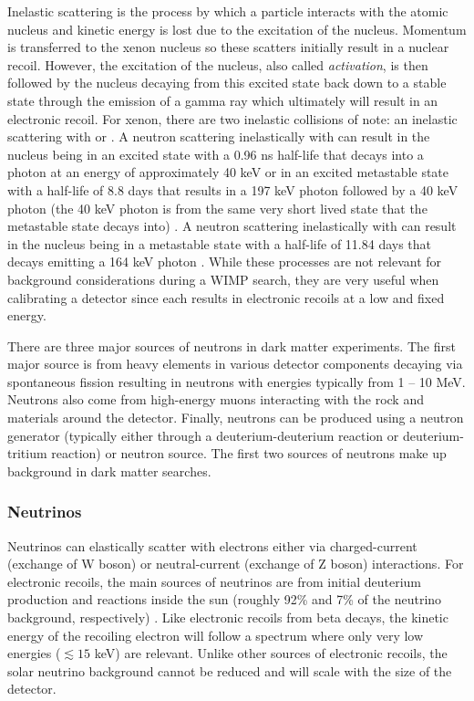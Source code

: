 Inelastic scattering is the process by which a particle interacts with the atomic nucleus and kinetic energy is lost due to the excitation of the nucleus.  Momentum is transferred to the xenon nucleus so these scatters initially result in a nuclear recoil.  However, the excitation of the nucleus, also called \textit{activation}, is then followed by the nucleus decaying from this excited state back down to a stable state through the emission of a gamma ray which ultimately will result in an electronic recoil.  For xenon, there are two inelastic collisions of note:  an inelastic scattering with  or .  A neutron scattering inelastically with  can result in the nucleus being in an excited state with a 0.96 ns half-life that decays into a photon at an energy of approximately 40 keV or in an excited metastable state with a half-life of 8.8 days that results in a 197 keV photon followed by a 40 keV photon (the 40 keV photon is from the same very short lived state that the metastable state decays into) \cite{timar2014nuclear}.  A neutron scattering inelastically with  can result in the nucleus being in a metastable state with a half-life of 11.84 days that decays emitting a 164 keV photon \cite{khazov2006nuclear}.   While these processes are not relevant for background considerations during a WIMP search, they are very useful when calibrating a detector since each results in electronic recoils at a low and fixed energy.

There are three major sources of neutrons in dark matter experiments.  The first major source is from heavy elements in various detector components decaying via spontaneous fission resulting in neutrons with energies typically from 1 -- 10 MeV.  Neutrons also come from high-energy muons interacting with the rock and materials around the detector.  Finally, neutrons can be produced using a neutron generator (typically either through a deuterium-deuterium reaction or deuterium-tritium reaction) or neutron source.  The first two sources of neutrons make up background in dark matter searches.


\subsubsection{Neutrinos}


Neutrinos can elastically scatter with electrons either via charged-current (exchange of W boson) or neutral-current (exchange of Z boson) interactions.  For electronic recoils, the main sources of neutrinos are from initial deuterium production and  reactions inside the sun (roughly 92\% and 7\% of the neutrino background, respectively) \cite{aprile2016physics}.  Like electronic recoils from beta decays, the kinetic energy of the recoiling electron will follow a spectrum where only very low energies ($\lesssim 15$ keV) are relevant.  Unlike other sources of electronic recoils, the solar neutrino background cannot be reduced and will scale with the size of the detector.

